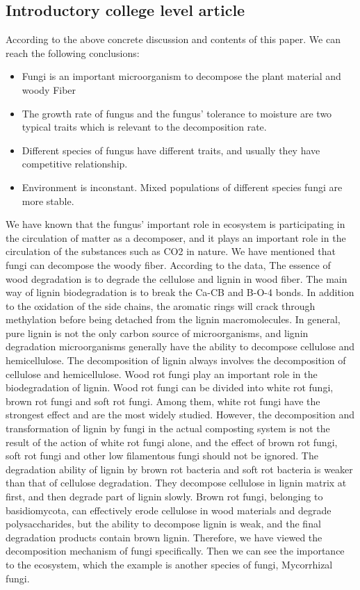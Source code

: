 \documentclass{mcmthesis}
\begin{document}
\begin{appendices}

\section{Introductory college level article}
According to the above concrete discussion and contents of this paper. We can reach the following conclusions: 
\begin{itemize}
  \item Fungi is an important microorganism to decompose the plant material and woody Fiber
  \item The growth rate of fungus and the fungus’ tolerance to moisture are two typical traits which is relevant to the decomposition rate.
  \item Different species of fungus have different traits, and usually they have competitive relationship.
  \item Environment is inconstant. Mixed populations of different species fungi are more stable.
\end{itemize}

We have known that the fungus’ important role in ecosystem is participating in the circulation of matter as a decomposer, and it plays an important role in the circulation of the substances such as CO2 in nature. 
We have mentioned that fungi can decompose the woody fiber. 
According to the data, The essence of wood degradation is to degrade the cellulose and lignin in wood fiber. 
The main way of lignin biodegradation is to break the Ca-CB and B-O-4 bonds. 
In addition to the oxidation of the side chains, the aromatic rings will crack through methylation before being detached from the lignin macromolecules. 
In general, pure lignin is not the only carbon source of microorganisms, and lignin degradation microorganisms generally have the ability to decompose cellulose and hemicellulose. 
The decomposition of lignin always involves the decomposition of cellulose and hemicellulose.
Wood rot fungi play an important role in the biodegradation of lignin. Wood rot fungi can be divided into white rot fungi, brown rot fungi and soft rot fungi. 
Among them, white rot fungi have the strongest effect and are the most widely studied.
However, the decomposition and transformation of lignin by fungi in the actual composting system is not the result of the action of white rot fungi alone, and the effect of brown rot fungi, soft rot fungi and other low filamentous fungi should not be ignored. 
The degradation ability of lignin by brown rot bacteria and soft rot bacteria is weaker than that of cellulose degradation. 
They decompose cellulose in lignin matrix at first, and then degrade part of lignin slowly. 
Brown rot fungi, belonging to basidiomycota, can effectively erode cellulose in wood materials and degrade polysaccharides, but the ability to decompose lignin is weak, and the final degradation products contain brown lignin. 
Therefore, we have viewed the decomposition mechanism of fungi specifically. 
Then we can see the importance to the ecosystem, which the example is another species of fungi, Mycorrhizal fungi.


\end{appendices}
\end{document}
